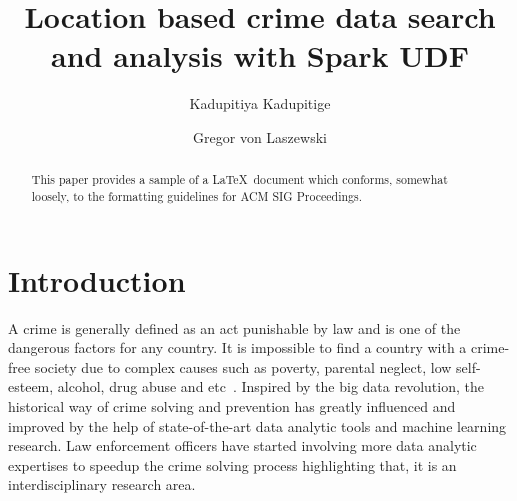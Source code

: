 
\title{Location based crime data search and analysis with Spark UDF}


\author{Kadupitiya Kadupitige}

\author{Gregor von Laszewski}


\renewcommand{\shortauthors}{G. v. Laszewski}


\begin{abstract}
This paper provides a sample of a \LaTeX\ document which conforms,
somewhat loosely, to the formatting guidelines for
ACM SIG Proceedings.
\end{abstract}



\maketitle


\section{Introduction}

A crime is generally defined as an act punishable by law and is one of
the dangerous factors for any
country\cite{hid-sp18-409-agarwal2013crime}. It is impossible to find
a country with a crime- free society due to complex causes such as
poverty, parental neglect, low self-esteem, alcohol, drug abuse and
etc~\cite{hid-sp18-409-bharathi2014survey,
hid-sp18-409-kiani2015analysis}.  Inspired by the big data revolution,
the historical way of crime solving and prevention has greatly
influenced and improved by the help of state-of-the-art data analytic
tools and machine learning research. Law enforcement officers have
started involving more data analytic expertises to speedup the crime
solving process highlighting that, it is an interdisciplinary research
area.

